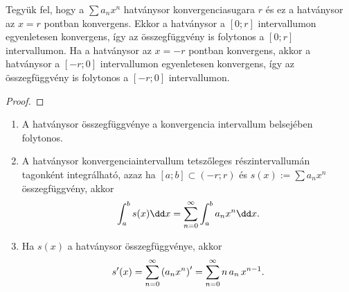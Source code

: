 \begin{theorem}
  Tegyük fel, hogy a $\sum a_n x^n$ hatványsor konvergenciasugara $r$ és ez a
  hatványsor az $x = r$ pontban konvergens. Ekkor a hatványsor a $[0; r]$
  intervallumon egyenletesen konvergens, így az összegfüggvény is folytonos a
  $[0; r]$ intervallumon. Ha a hatványsor az $x = -r$ pontban konvergens, akkor
  a hatványsor a $[-r; 0]$ intervallumon egyenletesen konvergens, így az
  összegfüggvény is folytonos a $[-r; 0]$ intervallumon.

  \begin{proof}
    \vspace{20em}
  \end{proof}
\end{theorem}

\begin{note}

  \begin{enumerate}
    \item A hatványsor összegfüggvénye a konvergencia intervallum belsejében
          folytonos.

    \item A hatványsor konvergenciaintervallum tetszőleges részintervallumán
          tagonként integrálható, azaz ha $[a; b] \subset (-r; r)$ és
          $s(x) := \sum a_n x^n$ összegfüggvény, akkor
          $$
            \int_a^b s(x) \dd x = \sum_{n = 0}^{\infty} \int_a^b a_n x^n \dd x
            \text.
          $$

    \item Ha $s(x)$ a hatványsor összegfüggvénye, akkor
          $$
            s'(x)
            = \sum_{n = 0}^{\infty} \left( a_n x^n \right)'
            = \sum_{n = 0}^{\infty} n \, a_n \, x^{n - 1}
            \text.
          $$
  \end{enumerate}
\end{note}